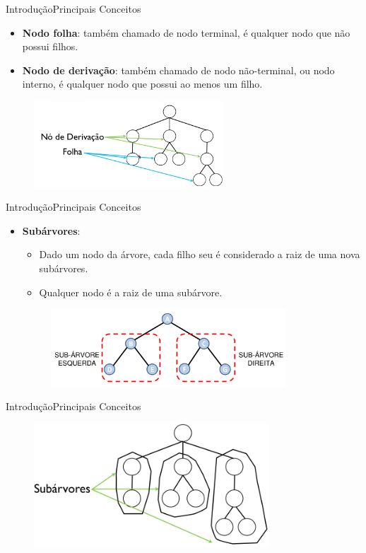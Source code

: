 \documentclass[aspectratio=169]{beamer}
\begin{document}
\begin{frame}{Introdução}{Principais Conceitos}
\begin{itemize}
 \item {\bf Nodo folha}: também chamado de nodo terminal, é qualquer nodo que não possui filhos.
 \item {\bf Nodo de derivação}: também chamado de nodo não-terminal, ou nodo interno, é qualquer nodo que possui ao menos um filho.
\end{itemize}
 \begin{figure}[!h]
  \centering
   \includegraphics[width=200pt]{imagens/nodo_derivacao_interno.png}
  \label{fig_nodo_derivacao_interno}
\end{figure}
\end{frame}


\begin{frame}{Introdução}{Principais Conceitos}
\begin{itemize}
 \item {\bf Subárvores}:
 \begin{itemize}
 \item Dado um nodo da árvore, cada filho seu é considerado a raiz de uma nova subárvores.
 \item Qualquer nodo é a raiz de uma subárvore.
 \end{itemize}
 \begin{figure}[!h]
  \centering
   \includegraphics[width=250pt]{imagens/subarvores1.png}
  \label{fig_subarvores1}
\end{figure}
\end{itemize}
\end{frame}

\begin{frame}{Introdução}{Principais Conceitos}
 \begin{figure}[!h]
  \centering
   \includegraphics[width=250pt]{imagens/subarvores2.png}
  \label{fig_subarvores2}
\end{figure}
\end{frame}
\end{document}
